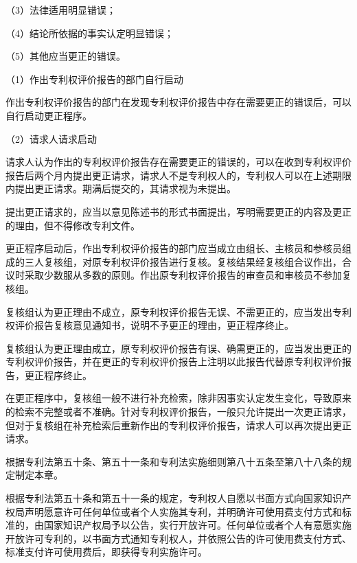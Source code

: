 {\setlength{\parindent}{17.1bp}（3）法律适用明显错误；\par}

{\setlength{\parindent}{17.1bp}（4）结论所依据的事实认定明显错误；\par}

{\setlength{\parindent}{17.1bp}（5）其他应当更正的错误。\par}

{\setlength{\parindent}{17.1bp}（1）作出专利权评价报告的部门自行启动\par}

作出专利权评价报告的部门在发现专利权评价报告中存在需要更正的错误后，可以自行启动更正程序。

{\setlength{\parindent}{17.1bp}（2）请求人请求启动\par}

请求人认为作出的专利权评价报告存在需要更正的错误的，可以在收到专利权评价报告后两个月内提出更正请求，请求人不是专利权人的，专利权人可以在上述期限内提出更正请求。期满后提交的，其请求视为未提出。

提出更正请求的，应当以意见陈述书的形式书面提出，写明需要更正的内容及更正的理由，但不得修改专利文件。

更正程序启动后，作出专利权评价报告的部门应当成立由组长、主核员和参核员组成的三人复核组，对原专利权评价报告进行复核。复核结果经复核组合议作出，合议时采取少数服从多数的原则。作出原专利权评价报告的审查员和审核员不参加复核组。

复核组认为更正理由不成立，原专利权评价报告无误、不需更正的，应当发出专利权评价报告复核意见通知书，说明不予更正的理由，更正程序终止。

复核组认为更正理由成立，原专利权评价报告有误、确需更正的，应当发出更正的专利权评价报告，并在更正的专利权评价报告上注明以此报告代替原专利权评价报告，更正程序终止。

在更正程序中，复核组一般不进行补充检索，除非因事实认定发生变化，导致原来的检索不完整或者不准确。针对专利权评价报告，一般只允许提出一次更正请求，但对于复核组在补充检索后重新作出的专利权评价报告，请求人可以再次提出更正请求。

根据专利法第五十条、第五十一条和专利法实施细则第八十五条至第八十八条的规定制定本章。

根据专利法第五十条和第五十一条的规定，专利权人自愿以书面方式向国家知识产权局声明愿意许可任何单位或者个人实施其专利，并明确许可使用费支付方式和标准的，由国家知识产权局予以公告，实行开放许可。任何单位或者个人有意愿实施开放许可专利的，以书面方式通知专利权人，并依照公告的许可使用费支付方式、标准支付许可使用费后，即获得专利实施许可。


